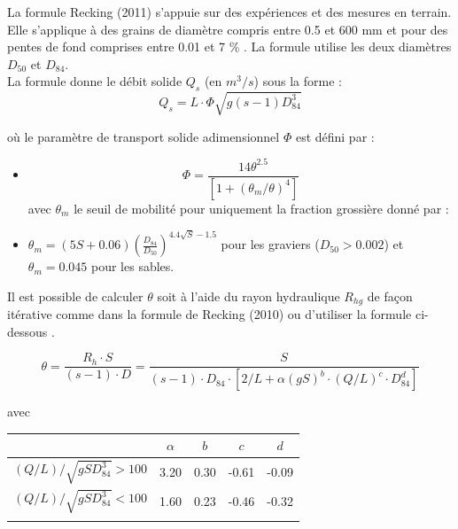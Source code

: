\documentclass[a4paper,10pt]{article}
\begin{document}
\noindent
La formule Recking (2011) s'appuie sur des exp\'eriences et des mesures en terrain. Elle s'applique \`a des grains de diam\`etre compris entre 0.5 et 600 mm et pour des pentes de fond comprises entre 0.01 et 7 \% \cite{rec1}. La formule utilise les deux diam\`etres $D_{50}$ et $D_{84}$. \\

\noindent
La formule donne le d\'ebit solide $Q_s$ (en $m^3/s$) sous la forme :
$$ Q_s = L \cdot \Phi \sqrt{g (s-1) D_{84}^{3}} $$

\noindent
o\`u le param\`etre de transport solide adimensionnel $\Phi$ est d\'efini par : 
\begin{itemize}
\item[] $$ \Phi = \frac{ {14\theta}^{2.5} }{ [1 + (\theta_m/\theta)^4] } $$
avec $\theta_m$ le seuil de mobilit\'e pour uniquement la fraction grossi\`ere donn\'e par : 
\item[] $ \theta_m = (5 S + 0.06) \left(\frac{D_{84}}{D_{50}}\right)^{4.4 \sqrt{S} - 1.5} $ pour les graviers ($ D_{50} > 0.002$) et $ \theta_m = 0.045$ pour les sables. \\ 
\end{itemize}

\noindent
Il est possible de calculer $\theta$ soit \`a l'aide du rayon hydraulique $R_{hg}$ de fa\c con it\'erative comme dans la formule de Recking (2010) ou d'utiliser la formule ci-dessous \cite{rec3}. 

$$ \theta = \frac{R_h \cdot S}{(s - 1) \cdot D} = \frac{S}{(s-1) \cdot D_{84} \cdot [2/L + \alpha (gS)^b \cdot  (Q/L)^c \cdot D_{84}^d]} $$

\noindent
avec 
\begin{center}
\begin{tabular}{c c c c c}
$                                   $	& $\alpha$  & $b$  & $c$   & $d$ \\ \hline
$ (Q/L) / \sqrt{g S D_{84}^3} > 100 $	& 3.20 		& 0.30 & -0.61 & -0.09 \\ \hline
$ (Q/L) / \sqrt{g S D_{84}^3} < 100 $	& 1.60 		& 0.23 & -0.46 & -0.32 \\ \hline \\
\end{tabular}
\end{center} 

\vspace{0.3cm}

\end{document}
